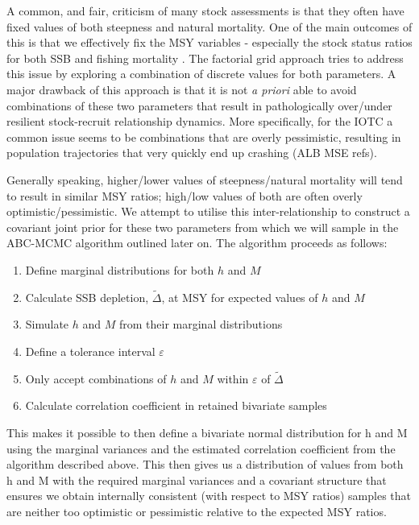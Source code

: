 \documentclass[12pt,a4paper,twoside,times,sky,standard]{csiroreport2017}
\newcommand{\veps}{\varepsilon}
\begin{document}
A common, and fair, criticism of many stock assessments is that they often have fixed values of both steepness and natural mortality. One of the main outcomes of this is that we effectively fix the MSY variables - especially the stock status ratios for both SSB and fishing mortality \cite{steepm}. The factorial grid approach tries to address this issue by exploring a combination of discrete values for both parameters. A major drawback of this approach is that it is not \textit{a priori} able to avoid combinations of these two parameters that result in pathologically over/under resilient stock-recruit relationship dynamics. More specifically, for the IOTC a common issue seems to be combinations that are overly pessimistic, resulting in population trajectories that very quickly end up crashing (ALB MSE refs).

Generally speaking, higher/lower values of steepness/natural mortality will tend to result in similar MSY ratios; high/low values of both are often overly optimistic/pessimistic. We attempt to utilise this inter-relationship to construct a covariant joint prior for these two parameters from which we will sample in the ABC-MCMC algorithm outlined later on. The algorithm proceeds as follows:

\begin{enumerate}
    \item Define marginal distributions for both $h$ and $M$
    \item Calculate SSB depletion, $\tilde{\Delta}$, at MSY for expected values of $h$ and $M$
    \item Simulate $h$ and $M$ from their marginal distributions
    \item Define a tolerance interval $\veps$
    \item Only accept combinations of $h$ and $M$ within $\veps$ of $\tilde{\Delta}$
    \item Calculate correlation coefficient in retained bivariate samples
\end{enumerate}

This makes it possible to then define a bivariate normal distribution for h and M using the marginal variances and the estimated correlation coefficient from the algorithm described above. This then gives us a distribution of values from both h and M with the required marginal variances and a covariant structure that ensures we obtain internally consistent (with respect to MSY ratios) samples that are neither too optimistic or pessimistic relative to the expected MSY ratios.
\end{document}

